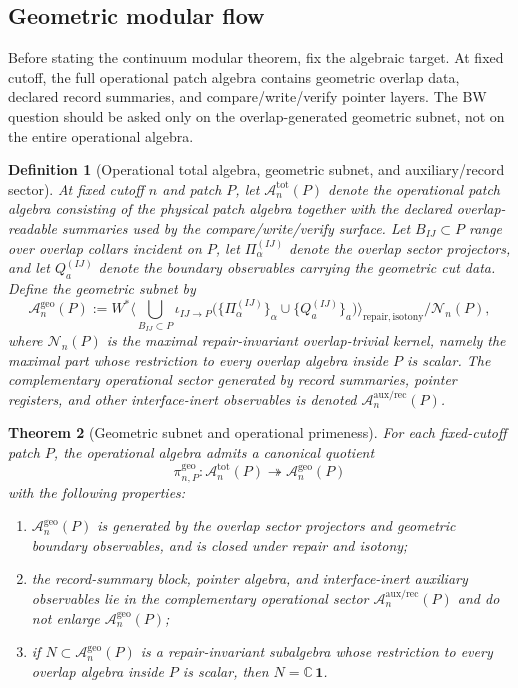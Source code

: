\documentclass[11pt]{article}
\newtheorem{theorem}{Theorem}[section]
\newtheorem{definition}[theorem]{Definition}
\begin{document}
\subsection{Geometric modular flow}

Before stating the continuum modular theorem, fix the algebraic target. At fixed cutoff, the full operational patch algebra contains geometric overlap data, declared record summaries, and compare/write/verify pointer layers. The BW question should be asked only on the overlap-generated geometric subnet, not on the entire operational algebra.

\begin{definition}[Operational total algebra, geometric subnet, and auxiliary/record sector]\label{def:geosubnet}
At fixed cutoff \(n\) and patch \(P\), let \(\mathcal A_n^{\mathrm{tot}}(P)\) denote the operational patch algebra consisting of the physical patch algebra together with the declared overlap-readable summaries used by the compare/write/verify surface. Let \(B_{IJ}\subset P\) range over overlap collars incident on \(P\), let \(\Pi_\alpha^{(IJ)}\) denote the overlap sector projectors, and let \(Q_a^{(IJ)}\) denote the boundary observables carrying the geometric cut data. Define the geometric subnet by
\[
\mathcal A_n^{\mathrm{geo}}(P)
:=
W^\ast\!\Big\langle
\bigcup_{B_{IJ}\subset P}
\iota_{IJ\to P}\!\bigl(
\{\Pi_\alpha^{(IJ)}\}_\alpha\cup\{Q_a^{(IJ)}\}_a
\bigr)
\Big\rangle_{\mathrm{repair,isotony}}
\Big/
\mathcal N_n(P),
\]
where \(\mathcal N_n(P)\) is the maximal repair-invariant overlap-trivial kernel, namely the maximal part whose restriction to every overlap algebra inside \(P\) is scalar. The complementary operational sector generated by record summaries, pointer registers, and other interface-inert observables is denoted \(\mathcal A_n^{\mathrm{aux/rec}}(P)\).
\end{definition}

\begin{theorem}[Geometric subnet and operational primeness]\label{thm:geosubnet}
For each fixed-cutoff patch \(P\), the operational algebra admits a canonical quotient
\[
\pi_{n,P}^{\mathrm{geo}}:\mathcal A_n^{\mathrm{tot}}(P)\twoheadrightarrow \mathcal A_n^{\mathrm{geo}}(P)
\]
with the following properties:
\begin{enumerate}[label=\textup{(\roman*)},leftmargin=2em]
\item \(\mathcal A_n^{\mathrm{geo}}(P)\) is generated by the overlap sector projectors and geometric boundary observables, and is closed under repair and isotony;
\item the record-summary block, pointer algebra, and interface-inert auxiliary observables lie in the complementary operational sector \(\mathcal A_n^{\mathrm{aux/rec}}(P)\) and do not enlarge \(\mathcal A_n^{\mathrm{geo}}(P)\);
\item if \(N\subset \mathcal A_n^{\mathrm{geo}}(P)\) is a repair-invariant subalgebra whose restriction to every overlap algebra inside \(P\) is scalar, then \(N=\mathbb C\,\mathbf 1\).
\end{enumerate}
\end{theorem}
\end{document}
